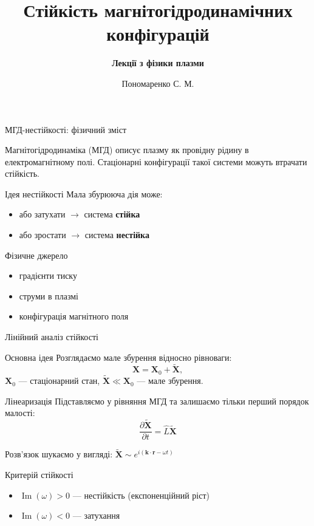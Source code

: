 \documentclass[]{beamer}
\title[Лекції з фізики плазми]{\bfseries\huge Стійкість магнітогідродинамічних конфігурацій}
\subtitle{\bfseries Лекції з фізики плазми}
\author{Пономаренко С. М.}
\date{}
\begin{document}
\begin{frame}
	\titlepage
\end{frame}

\begin{frame}{МГД-нестійкості: фізичний зміст}{}
	\begin{block}{}\justifying
		Магнітогідродинаміка (МГД) описує плазму як провідну рідину в електромагнітному полі.
		Стаціонарні конфігурації такої системи можуть втрачати стійкість.
	\end{block}

	\begin{block}{Ідея нестійкості}
		Мала збурююча дія може:
		\begin{itemize}
			\item або затухати $\rightarrow$ система \textbf{стійка}
			\item або зростати $\rightarrow$ система \textbf{нестійка}
		\end{itemize}
	\end{block}

	\begin{block}{Фізичне джерело}
		\begin{itemize}
			\item градієнти тиску
			\item струми в плазмі
			\item конфігурація магнітного поля
		\end{itemize}
	\end{block}
\end{frame}

\begin{frame}{Лінійний аналіз стійкості}{}
	\begin{block}{Основна ідея}
		Розглядаємо мале збурення відносно рівноваги:
		\[
			\mathbf{X} = \mathbf{X}_0 + \tilde{\mathbf{X}},
		\]
		$\mathbf{X}_0$ --- стаціонарний стан, $\tilde{\mathbf{X}} \ll \mathbf{X}_0$ --- мале збурення.
	\end{block}

	\begin{block}{Лінеаризація}
		Підставляємо у рівняння МГД та залишаємо тільки перший порядок малості:
		\[
			\frac{\partial \tilde{\mathbf{X}}}{\partial t} = \hat{L} \tilde{\mathbf{X}}
		\]
	\end{block}

	\begin{block}{}
		Розв'язок шукаємо у вигляді:
		\(
		\tilde{\mathbf{X}} \sim e^{i(\mathbf{k}\cdot \mathbf{r} - \omega t)}
		\)
	\end{block}

	\begin{block}{Критерій стійкості}
		\begin{itemize}
			\item $\operatorname{Im}(\omega) > 0$ --- нестійкість (експоненційний ріст)
			\item $\operatorname{Im}(\omega) < 0$ --- затухання
		\end{itemize}
	\end{block}
\end{frame}
\end{document}
